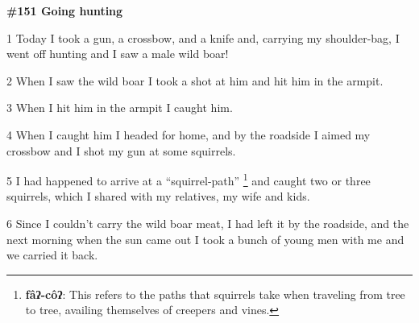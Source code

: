 
\textbf{\#151 Going hunting}

1 Today I took a gun, a crossbow, and a knife and, carrying my shoulder-bag, I
went off hunting and I saw a male wild boar!

2 When I saw the wild boar I took a shot at him and hit him in the armpit.

3 When I hit him in the armpit I caught him.

4 When I caught him I headed for home, and by the roadside I aimed my crossbow
and I shot my gun at some squirrels.

5 I had happened to arrive at a ``squirrel-path'' \footnote{\textbf{fâʔ-côʔ}: This refers to the paths that squirrels take when traveling from tree to tree, availing themselves of creepers and vines.} and caught two or three squirrels,
which I shared with my relatives, my wife and kids.

6 Since I couldn't carry the wild boar meat, I had left it by the roadside, and
the next morning when the sun came out I took a bunch of young men with me and
we carried it back.

